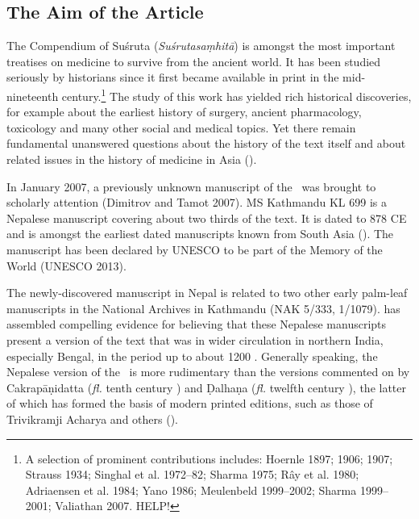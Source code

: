 
\subsection{The Aim of the Article}

The Compendium of Suśruta (\emph{Suśrutasaṃhitā}) is amongst the most important treatises on medicine to survive from the ancient world. It has been studied seriously by historians since it first became available in print in the mid-nineteenth century.\footnote{A selection of prominent contributions includes: Hoernle 1897; 1906; 1907; Strauss 1934; Singhal et al. 1972–82; Sharma 1975; Rây et al. 1980; Adriaensen et al. 1984; Yano 1986; Meulenbeld 1999–2002; Sharma 1999–2001; Valiathan 2007. HELP!} The study of this work has yielded rich historical discoveries, for example about the earliest history of surgery, ancient pharmacology, toxicology and many other social and medical topics. Yet there remain fundamental unanswered questions about the history of the text itself and about related issues in the history of medicine in Asia (\cite[IA, 203–389]{meul-hist}). 

In January 2007, a previously unknown manuscript of the \SS\ was brought to scholarly attention (Dimitrov and Tamot 2007). MS Kathmandu KL 699 is a Nepalese manuscript covering about two thirds of the text. It is dated to 878 CE and is amongst the earliest dated manuscripts known from South Asia (\cite[87–88]{hari-2011}). The manuscript has been declared by UNESCO to be part of the Memory of the World (UNESCO 2013).

The newly-discovered manuscript in Nepal is related to two other early palm-leaf manuscripts in the National Archives in Kathmandu (NAK 5/333, 1/1079). \citet{kleb-2011,kleb-2021b} has assembled compelling evidence for believing that these Nepalese manuscripts present a version of the text that was in wider circulation in northern India, especially Bengal, in the period up to about 1200 \AD. Generally speaking, the Nepalese version of the \SS\ is more rudimentary than the versions commented on by Cakrapāṇidatta (\emph{fl.} tenth century \AD) and Ḍalhaṇa (\emph{fl.} twelfth century \AD), the latter of which has formed the basis of modern printed editions, such as those of Trivikramji Acharya and others (\cite{susr-trikamji1,vulgate,shar-susr}). 

